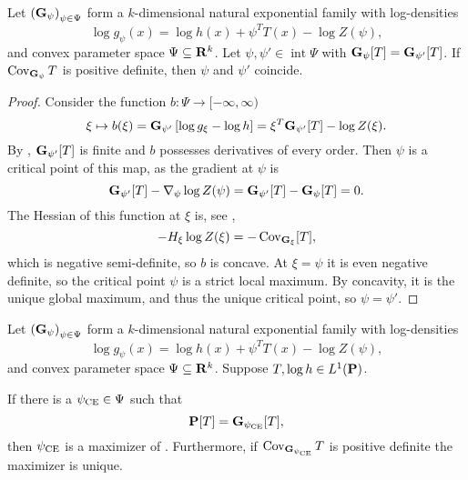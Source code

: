 \begin{lemma}
    \label{lem:psiunique}
    Let $\left( \G_{\psi} \right)_{\psi \in \Psi}$ form a $k$-dimensional natural exponential family with log-densities 
    $$
    \log g_{\psi}(x) = \log h(x) + \psi^{T} T(x) - \log Z(\psi),
    $$
    and convex parameter space $\Psi \subseteq \R^{k}$. 
    Let $\psi, \psi' \in \operatorname{int} \Psi$ with $\G_{\psi} [T] = \G_{\psi'} [T]$. If $\cov_{\G_{\psi}} T$ is positive definite, then $\psi$ and $\psi'$ coincide.
\end{lemma}

\begin{proof}
    Consider the function $b: \Psi \to [-\infty, \infty)$
    $$
        \xi \mapsto b(\xi) = \G_{\psi'} \left[ \log g_{\xi} - \log h \right] = \xi^{T}\G_{\psi'} [T] - \log Z(\xi).
    $$
    By , $\G_{\psi'}[T]$ is finite and $b$ possesses derivatives of every order.
    Then $\psi$ is a critical point of this map, as the gradient at $\psi$ is
    $$
        \G_{\psi'} [T] - \nabla_{\psi} \log Z(\psi) = \G_{\psi'}[T] - \G_{\psi}[T] = 0.
    $$
    The Hessian of this function at $\xi$ is, see ,
    $$
        -H_{\xi} \log Z(\xi) = - \cov_{\G_{\xi}} [T],
    $$
    which is negative semi-definite, so $b$ is concave. At $\xi = \psi$ it is even negative definite, so the critical point $\psi$ is a strict local maximum. By concavity, it is the unique global maximum, and thus the unique critical point, so $\psi = \psi'$.
\end{proof}

\begin{proposition}
    \label{prop:cem_exponential_families}
    Let $\left( \G_{\psi} \right)_{\psi \in \Psi}$ form a $k$-dimensional natural exponential family with log-densities 
    $$
    \log g_{\psi}(x) = \log h(x) + \psi^{T} T(x) - \log Z(\psi),
    $$
    and convex parameter space $\Psi \subseteq \R^{k}$. 
    Suppose $T, \log h \in L^{1}(\P)$.

    If there is a $\pce \in \Psi$ such that 
    $$
    \P[T] = \G_{\pce} [T],
    $$
    then $\pce$ is a maximizer of . Furthermore, if $\cov_{\G_{\pce}} T$ is positive definite the maximizer is unique.
\end{proposition}

